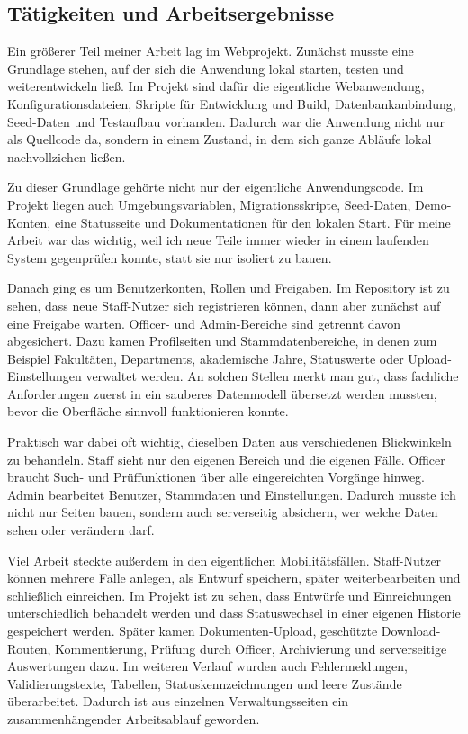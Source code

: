 \documentclass{Vorlage}
\begin{document}
\subsection{T\"atigkeiten und Arbeitsergebnisse}

Ein gr\"o\ss{}erer Teil meiner Arbeit lag im Webprojekt. Zun\"achst musste eine Grundlage stehen, auf der sich die Anwendung lokal starten, testen und weiterentwickeln lie\ss{}. Im Projekt sind daf\"ur die eigentliche Webanwendung, Konfigurationsdateien, Skripte f\"ur Entwicklung und Build, Datenbankanbindung, Seed-Daten und Testaufbau vorhanden. Dadurch war die Anwendung nicht nur als Quellcode da, sondern in einem Zustand, in dem sich ganze Abl\"aufe lokal nachvollziehen lie\ss{}en.

Zu dieser Grundlage geh\"orte nicht nur der eigentliche Anwendungscode. Im Projekt liegen auch Umgebungsvariablen, Migrationsskripte, Seed-Daten, Demo-Konten, eine Statusseite und Dokumentationen f\"ur den lokalen Start. F\"ur meine Arbeit war das wichtig, weil ich neue Teile immer wieder in einem laufenden System gegenpr\"ufen konnte, statt sie nur isoliert zu bauen.

Danach ging es um Benutzerkonten, Rollen und Freigaben. Im Repository ist zu sehen, dass neue Staff-Nutzer sich registrieren k\"onnen, dann aber zun\"achst auf eine Freigabe warten. Officer- und Admin-Bereiche sind getrennt davon abgesichert. Dazu kamen Profilseiten und Stammdatenbereiche, in denen zum Beispiel Fakult\"aten, Departments, akademische Jahre, Statuswerte oder Upload-Einstellungen verwaltet werden. An solchen Stellen merkt man gut, dass fachliche Anforderungen zuerst in ein sauberes Datenmodell \"ubersetzt werden mussten, bevor die Oberfl\"ache sinnvoll funktionieren konnte.

Praktisch war dabei oft wichtig, dieselben Daten aus verschiedenen Blickwinkeln zu behandeln. Staff sieht nur den eigenen Bereich und die eigenen F\"alle. Officer braucht Such- und Pr\"uffunktionen \"uber alle eingereichten Vorg\"ange hinweg. Admin bearbeitet Benutzer, Stammdaten und Einstellungen. Dadurch musste ich nicht nur Seiten bauen, sondern auch serverseitig absichern, wer welche Daten sehen oder ver\"andern darf.

Viel Arbeit steckte au\ss{}erdem in den eigentlichen Mobilit\"atsf\"allen. Staff-Nutzer k\"onnen mehrere F\"alle anlegen, als Entwurf speichern, sp\"ater weiterbearbeiten und schlie\ss{}lich einreichen. Im Projekt ist zu sehen, dass Entw\"urfe und Einreichungen unterschiedlich behandelt werden und dass Statuswechsel in einer eigenen Historie gespeichert werden. Sp\"ater kamen Dokumenten-Upload, gesch\"utzte Download-Routen, Kommentierung, Pr\"ufung durch Officer, Archivierung und serverseitige Auswertungen dazu. Im weiteren Verlauf wurden auch Fehlermeldungen, Validierungstexte, Tabellen, Statuskennzeichnungen und leere Zust\"ande \"uberarbeitet. Dadurch ist aus einzelnen Verwaltungsseiten ein zusammenh\"angender Arbeitsablauf geworden.
\end{document}
